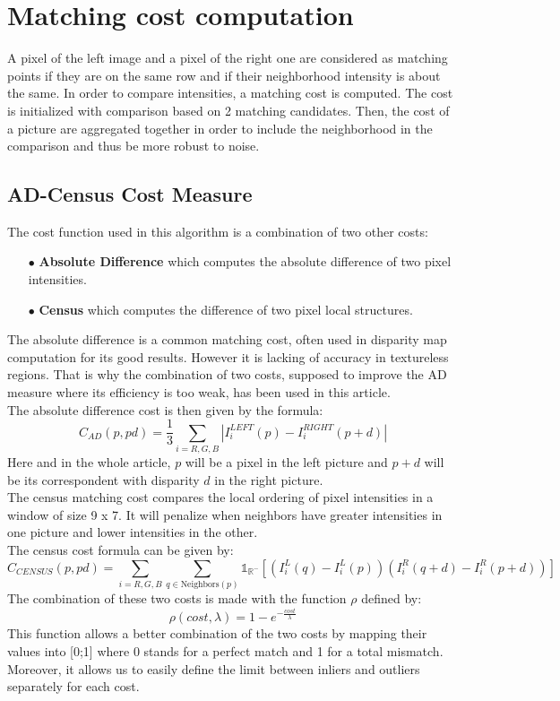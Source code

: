 \documentclass{article}
\begin{document}
\newpage

\section{Matching cost computation}

A pixel of the left image and a pixel of the right one are considered as matching points if they are on the same row and if their neighborhood intensity is about the same. In order to compare intensities, a matching cost is computed. The cost is initialized with comparison based on 2 matching candidates. Then, the cost of a picture are aggregated together in order to include the neighborhood in the comparison and thus be more robust to noise. 

\subsection{AD-Census Cost Measure}

The cost function used in this algorithm is a combination of two other costs:
\begin{itemize}
	\item[$\bullet$]\textbf{ Absolute Difference} which computes the absolute difference of two pixel intensities.
	\item[$\bullet$]\textbf{ Census} which computes the difference of two pixel local structures.
\end{itemize}

The absolute difference is a common matching cost, often used in disparity map computation for its good results. However it is lacking of accuracy in textureless regions. That is why the combination of two costs, supposed to improve the AD measure where its efficiency is too weak, has been used in this article.\\
The absolute difference cost is then given by the formula:
\[
	C_{AD}(p, pd) = \frac{1}{3} \sum_{i = R, G, B}  | I_i^{LEFT}(p) - I_i^{RIGHT}(p+d) | 
\]
Here and in the whole article, $p$ will be a pixel in the left picture and $p + d$ will be its correspondent with disparity $d$ in the right picture.\\
The census matching cost compares the local ordering of pixel intensities in a window of size 9 x 7. It will penalize when neighbors have greater intensities in one picture and lower intensities in the other.\\
The census cost formula can be given by:
\[
	C_{CENSUS}(p, pd) = \sum_{i = R, G, B} \sum_{q \in \text{Neighbors}(p)} \mathds{1}_{\mathbb{R}^-}\left[\left(I_i^{L}(q)-I_i^{L}(p)\right)\left(I_i^{R}(q+d)-I_i^{R}(p+d)\right)\right]
\]
The combination of these two costs is made with the function $\rho$ defined by:
\[
	\rho(cost, \lambda) = 1 - e^{-\frac{cost}{\lambda}}
\]
This function allows a better combination of the two costs by mapping their values into [0;1] where 0 stands for a perfect match and 1 for a total mismatch. Moreover, it allows us to easily define the limit between inliers and outliers separately for each cost.\\
\end{document}
